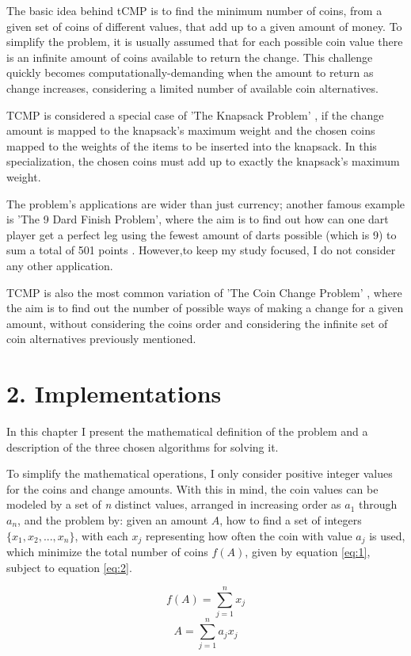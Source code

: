 \documentclass[shortpaper]{revdetua}
\begin{document}
The basic idea behind tCMP is to find the minimum number of coins, from a given 
set of coins of different values, that add up to a given amount of money.
To simplify the problem, it is usually assumed that for each possible coin value
there is an infinite amount of coins available to return the change.
This challenge quickly becomes computationally-demanding when the amount to 
return as change increases, considering a limited number of available coin 
alternatives.

TCMP is considered a special case of 'The Knapsack Problem' \cite{mit}, if 
the change amount is mapped to the knapsack's maximum weight and the chosen 
coins mapped to the weights of the items to be inserted into the knapsack.
In this specialization, the chosen coins must add up to exactly the knapsack's
maximum weight. 

The problem's applications are wider than just currency; another famous example 
is 'The 9 Dard Finish Problem', where the aim is to find out how can one dart 
player get a perfect leg using the fewest amount of darts possible (which is 9)
to sum a total of 501 points \cite{9df}.
However,to keep my study focused, I do not consider any other application.

TCMP is also the most common variation of 'The Coin Change Problem' \cite{g4g},
where the aim is to  find out the number of possible ways of making a change for
a given amount, without considering the coins order and considering the infinite
set of coin alternatives previously mentioned. 


\section*{2. Implementations}

In this chapter I present the mathematical definition of the problem and a
description of the three chosen algorithms for solving it.

To simplify the mathematical operations, I only consider positive integer values
for the coins and change amounts.
With this in mind, the coin values can be modeled by a set of {\it n\/} distinct 
values, arranged in increasing order as $a_1$ through $a_n$, and the 
problem by: given an amount $A$, how to find a set of integers 
$\{ x_1, x_2, ..., x_n\}$, with each $x_j$ representing how often the coin 
with value $a_j$ is used, which minimize the total number of coins 
$f(A)$, given by equation \ref{eq:1}, subject to equation \ref{eq:2}.
{
    \begin{multicols}{2}
        \begin{equation} \label{eq:1}
            f(A) = \sum_{j=1}^{n} x_j
        \end{equation}
        \break
        \begin{equation} \label{eq:2}
            A = \sum_{j=1}^{n} a_j x_j
        \end{equation}
    \end{multicols}
}
\end{document}
